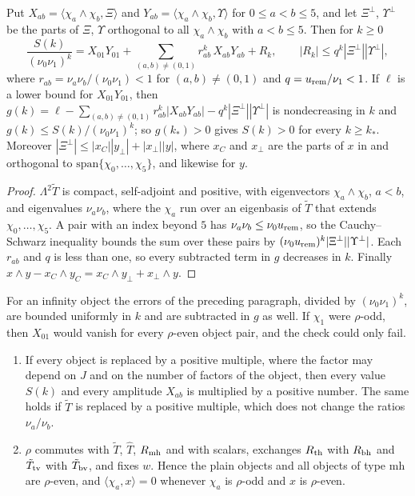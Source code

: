 \begin{lemma}\label{lem:rhnf}
Put $X_{ab}=\langle\chi_a\wedge\chi_b,\Xi\rangle$ and $Y_{ab}=\langle\chi_a\wedge\chi_b,\Upsilon\rangle$ for $0\le a<b\le5$, and let $\Xi^\perp$, $\Upsilon^\perp$ be
the parts of $\Xi$, $\Upsilon$ orthogonal to all $\chi_a\wedge\chi_b$ with $a<b\le5$. Then for $k\ge0$
\[
\frac{S(k)}{(\nu_0\nu_1)^k}=X_{01}Y_{01}+\sum_{(a,b)\ne(0,1)}r_{ab}^k\,X_{ab}Y_{ab}+R_k,\qquad|R_k|\le q^k|\Xi^\perp||\Upsilon^\perp|,
\]
where $r_{ab}=\nu_a\nu_b/(\nu_0\nu_1)<1$ for $(a,b)\ne(0,1)$ and $q=u_{\rm rem}/\nu_1<1$. If $\ell$ is a lower bound for $X_{01}Y_{01}$, then
$g(k)=\ell-\sum_{(a,b)\ne(0,1)}r_{ab}^k|X_{ab}Y_{ab}|-q^k|\Xi^\perp||\Upsilon^\perp|$ is nondecreasing in $k$ and $g(k)\le S(k)/(\nu_0\nu_1)^k$; so $g(k_*)>0$
gives $S(k)>0$ for every $k\ge k_*$. Moreover $|\Xi^\perp|\le|x_C||y_\perp|+|x_\perp||y|$, where $x_C$ and $x_\perp$ are the parts of $x$ in and orthogonal
to $\mathrm{span}\{\chi_0,\dots,\chi_5\}$, and likewise for $y$.
\end{lemma}

\begin{proof}
$\Lambda^2\tilde T$ is compact, self-adjoint and positive, with eigenvectors $\chi_a\wedge\chi_b$, $a<b$, and eigenvalues $\nu_a\nu_b$, where the $\chi_a$ run
over an eigenbasis of $\tilde T$ that extends $\chi_0,\dots,\chi_5$. A pair with an index beyond $5$ has $\nu_a\nu_b\le\nu_0u_{\rm rem}$, so the
Cauchy--Schwarz inequality bounds the sum over these pairs by $(\nu_0u_{\rm rem})^k|\Xi^\perp||\Upsilon^\perp|$. Each $r_{ab}$ and $q$ is less than one, so
every subtracted term in $g$ decreases in $k$. Finally $x\wedge y-x_C\wedge y_C=x_C\wedge y_\perp+x_\perp\wedge y$.
\end{proof}

\noindent For an infinity object the errors of the preceding paragraph, divided by $(\nu_0\nu_1)^k$, are bounded uniformly in $k$ and are subtracted in
$g$ as well. If $\chi_1$ were $\rho$-odd, then $X_{01}$ would vanish for every $\rho$-even object pair, and the check could only fail.

\begin{lemma}\label{lem:rhnp}
\begin{enumerate}
\item[(NORM)] If every object is replaced by a positive multiple, where the factor may depend on $J$ and on the number of factors of the object, then
every value $S(k)$ and every amplitude $X_{ab}$ is multiplied by a positive number. The same holds if $\tilde T$ is replaced by a positive multiple,
which does not change the ratios $\nu_a/\nu_b$.
\item[(PAR)] $\rho$ commutes with $\tilde T$, $\hat T$, $R_{\rm mh}$ and with scalars, exchanges $R_{\rm th}$ with $R_{\rm bh}$ and $\tilde T_{\rm tv}$ with
$\tilde T_{\rm bv}$, and fixes $w$. Hence the plain objects and all objects of type mh are $\rho$-even, and $\langle\chi_a,x\rangle=0$ whenever $\chi_a$ is
$\rho$-odd and $x$ is $\rho$-even.
\end{enumerate}
\end{lemma}

